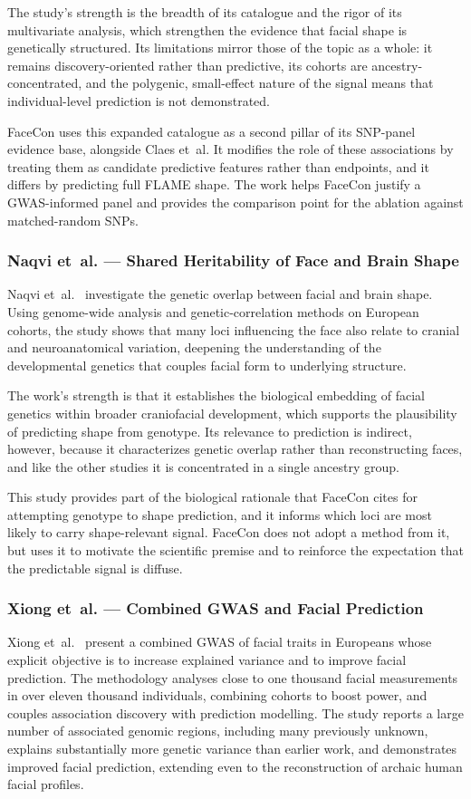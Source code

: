 The study's strength is the breadth of its catalogue and the rigor of its multivariate analysis, which strengthen the evidence that facial shape is genetically structured. Its limitations mirror those of the topic as a whole: it remains discovery-oriented rather than predictive, its cohorts are ancestry-concentrated, and the polygenic, small-effect nature of the signal means that individual-level prediction is not demonstrated.

FaceCon uses this expanded catalogue as a second pillar of its SNP-panel evidence base, alongside Claes et~al. It modifies the role of these associations by treating them as candidate predictive features rather than endpoints, and it differs by predicting full FLAME shape. The work helps FaceCon justify a GWAS-informed panel and provides the comparison point for the ablation against matched-random SNPs.

\subsubsection{Naqvi et~al. --- Shared Heritability of Face and Brain Shape}
Naqvi et~al.~\cite{ref:naqvi} investigate the genetic overlap between facial and brain shape. Using genome-wide analysis and genetic-correlation methods on European cohorts, the study shows that many loci influencing the face also relate to cranial and neuroanatomical variation, deepening the understanding of the developmental genetics that couples facial form to underlying structure.

The work's strength is that it establishes the biological embedding of facial genetics within broader craniofacial development, which supports the plausibility of predicting shape from genotype. Its relevance to prediction is indirect, however, because it characterizes genetic overlap rather than reconstructing faces, and like the other studies it is concentrated in a single ancestry group.

This study provides part of the biological rationale that FaceCon cites for attempting genotype to shape prediction, and it informs which loci are most likely to carry shape-relevant signal. FaceCon does not adopt a method from it, but uses it to motivate the scientific premise and to reinforce the expectation that the predictable signal is diffuse.

\subsubsection{Xiong et~al. --- Combined GWAS and Facial Prediction}
Xiong et~al.~\cite{ref:xiong} present a combined GWAS of facial traits in Europeans whose explicit objective is to increase explained variance and to improve facial prediction. The methodology analyses close to one thousand facial measurements in over eleven thousand individuals, combining cohorts to boost power, and couples association discovery with prediction modelling. The study reports a large number of associated genomic regions, including many previously unknown, explains substantially more genetic variance than earlier work, and demonstrates improved facial prediction, extending even to the reconstruction of archaic human facial profiles.

